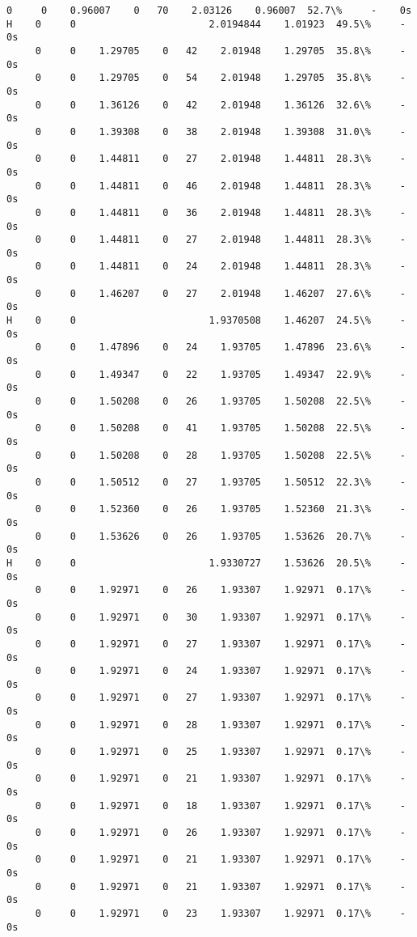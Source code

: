 \documentclass[11pt]{article}
\begin{document}
\begin{Verbatim}[commandchars=\\\{\}]
     0     0    0.96007    0   70    2.03126    0.96007  52.7\%     -    0s
H    0     0                       2.0194844    1.01923  49.5\%     -    0s
     0     0    1.29705    0   42    2.01948    1.29705  35.8\%     -    0s
     0     0    1.29705    0   54    2.01948    1.29705  35.8\%     -    0s
     0     0    1.36126    0   42    2.01948    1.36126  32.6\%     -    0s
     0     0    1.39308    0   38    2.01948    1.39308  31.0\%     -    0s
     0     0    1.44811    0   27    2.01948    1.44811  28.3\%     -    0s
     0     0    1.44811    0   46    2.01948    1.44811  28.3\%     -    0s
     0     0    1.44811    0   36    2.01948    1.44811  28.3\%     -    0s
     0     0    1.44811    0   27    2.01948    1.44811  28.3\%     -    0s
     0     0    1.44811    0   24    2.01948    1.44811  28.3\%     -    0s
     0     0    1.46207    0   27    2.01948    1.46207  27.6\%     -    0s
H    0     0                       1.9370508    1.46207  24.5\%     -    0s
     0     0    1.47896    0   24    1.93705    1.47896  23.6\%     -    0s
     0     0    1.49347    0   22    1.93705    1.49347  22.9\%     -    0s
     0     0    1.50208    0   26    1.93705    1.50208  22.5\%     -    0s
     0     0    1.50208    0   41    1.93705    1.50208  22.5\%     -    0s
     0     0    1.50208    0   28    1.93705    1.50208  22.5\%     -    0s
     0     0    1.50512    0   27    1.93705    1.50512  22.3\%     -    0s
     0     0    1.52360    0   26    1.93705    1.52360  21.3\%     -    0s
     0     0    1.53626    0   26    1.93705    1.53626  20.7\%     -    0s
H    0     0                       1.9330727    1.53626  20.5\%     -    0s
     0     0    1.92971    0   26    1.93307    1.92971  0.17\%     -    0s
     0     0    1.92971    0   30    1.93307    1.92971  0.17\%     -    0s
     0     0    1.92971    0   27    1.93307    1.92971  0.17\%     -    0s
     0     0    1.92971    0   24    1.93307    1.92971  0.17\%     -    0s
     0     0    1.92971    0   27    1.93307    1.92971  0.17\%     -    0s
     0     0    1.92971    0   28    1.93307    1.92971  0.17\%     -    0s
     0     0    1.92971    0   25    1.93307    1.92971  0.17\%     -    0s
     0     0    1.92971    0   21    1.93307    1.92971  0.17\%     -    0s
     0     0    1.92971    0   18    1.93307    1.92971  0.17\%     -    0s
     0     0    1.92971    0   26    1.93307    1.92971  0.17\%     -    0s
     0     0    1.92971    0   21    1.93307    1.92971  0.17\%     -    0s
     0     0    1.92971    0   21    1.93307    1.92971  0.17\%     -    0s
     0     0    1.92971    0   23    1.93307    1.92971  0.17\%     -    0s

\end{Verbatim}
\end{document}

